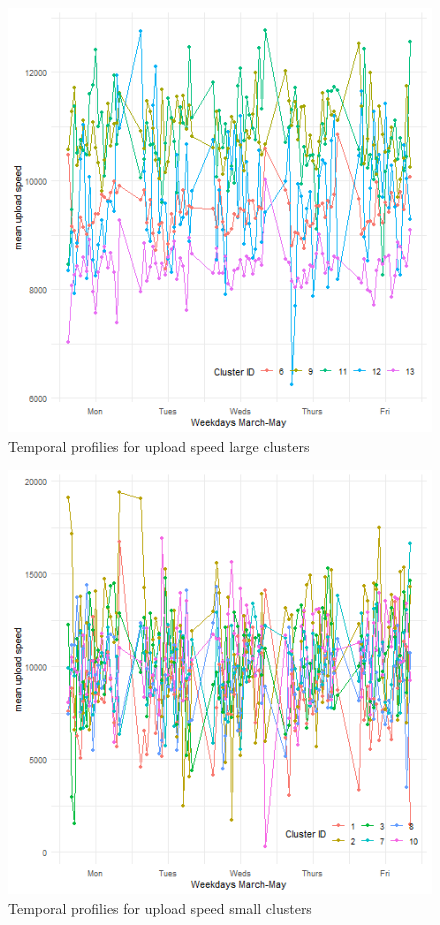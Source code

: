 \documentclass[Royal,times,sageh]{sagej}
\begin{document}
\begin{figure}
\includegraphics[width=0.95\linewidth]{figures/upClusterL} \caption{\label{UpClusterL}Temporal profilies for upload speed large clusters}\label{fig:unnamed-chunk-2}
\end{figure}

\begin{figure}
\includegraphics[width=0.95\linewidth]{figures/upClusterS} \caption{\label{UpClusterS}Temporal profilies for upload speed small clusters}\label{fig:unnamed-chunk-3}
\end{figure}
\end{document}
